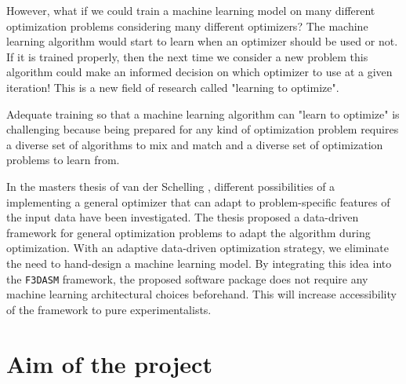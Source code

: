 \documentclass[10pt,a4paper,twoside]{article} %
\def\code#1{\texttt{#1}}
\begin{document}
However, what if we could train a machine learning model on many different optimization problems considering many different optimizers? The machine learning algorithm would start to learn when an optimizer should be used or not. If it is trained properly, then the next time we consider a new problem this algorithm could make an informed decision on which optimizer to use at a given iteration! This is a new field of research called "learning to optimize".

Adequate training so that a machine learning algorithm can "learn to optimize" is challenging because being prepared for any kind of optimization problem requires a diverse set of algorithms to mix and match and a diverse set of optimization problems to learn from.



In the masters thesis of van der Schelling \cite{Schelling2021}, different possibilities of a implementing a general optimizer that can adapt to problem-specific features of the input data have been investigated. The thesis proposed a data-driven framework for general optimization problems to adapt the algorithm during optimization. With an adaptive data-driven optimization strategy, we eliminate the need to hand-design a machine learning model. By integrating this idea into the \code{F3DASM} framework, the proposed software package does not require any machine learning architectural choices beforehand. This will increase accessibility of the framework to pure experimentalists. 

%


\section*{Aim of the project}
\end{document}
